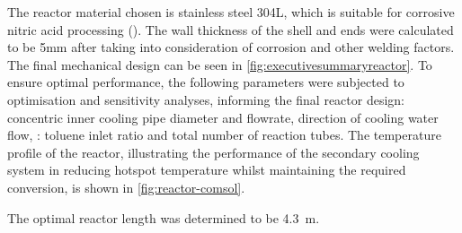 
The reactor material chosen is stainless steel 304L, which is suitable for corrosive nitric acid processing  (). The wall thickness of the shell and ends were calculated to be 5mm after taking into consideration of corrosion and other welding factors. The final mechanical design can be seen in \cref{fig:executivesummaryreactor}.
To ensure optimal performance, the following parameters were subjected to optimisation and sensitivity analyses, informing the final reactor design: concentric inner cooling pipe diameter and flowrate, direction of cooling water flow,  : toluene inlet ratio and total number of reaction tubes. The temperature profile of the reactor, illustrating the performance of the secondary cooling system in reducing hotspot temperature whilst maintaining the required conversion, is shown in \cref{fig:reactor-comsol}.  %

The optimal reactor length was determined to be \SI{4.3}{\m}. 

